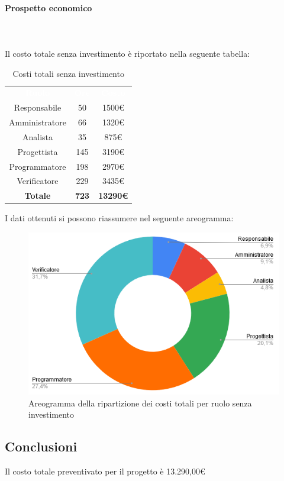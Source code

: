 \paragraph{Prospetto economico} \mbox{} \\ \mbox{} \\
Il costo totale senza investimento è riportato nella seguente tabella:

\begin{table}[H]
\centering\renewcommand{\arraystretch}{1.5}
\caption{Costi totali senza investimento}
\vspace{0.2cm}
\begin{tabular}{ c c c }
\rowcolor{redafk}
\textcolor{white}{\textbf{Ruolo}} & \textcolor{white}{\textbf{Ore}} & 
\textcolor{white}{\textbf{Costo}}  \\
Responsabile & 50 & 1500€ \\
Amministratore & 66 & 1320€ \\
Analista & 35 & 875€ \\
Progettista	& 145 & 3190€ \\
Programmatore & 198 & 2970€  \\
Verificatore & 229 & 3435€  \\
\rowcolor{lastrowcolor}
\textbf{Totale} & \textbf{723} & \textbf{13290€}  \\
\end{tabular}
\end{table}

I dati ottenuti si possono riassumere nel seguente areogramma:
\begin{figure}[H]
\centering
\includegraphics[scale=0.60]{img/grafici/torta_tot_no_analisi.png}
\caption{Areogramma della ripartizione dei costi totali per ruolo senza investimento}
\end{figure}

\subsection{Conclusioni}
Il costo totale preventivato per il progetto è 13.290,00€
